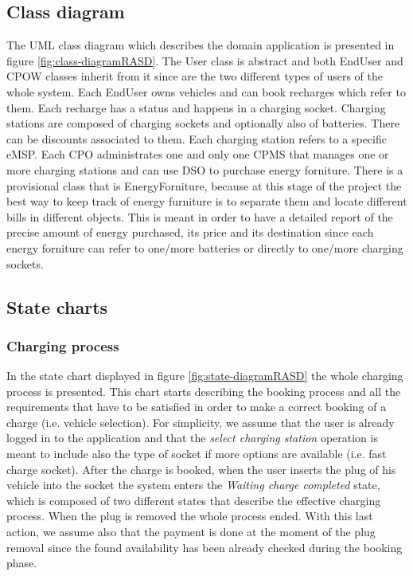 \documentclass[a4paper]{report}
\begin{document}
\subsection{Class diagram}
The UML class diagram which describes the domain application is presented in figure \ref{fig:class-diagramRASD}. The User class is abstract and both EndUser and CPOW classes inherit from it since are the two different types of users of the whole system. Each EndUser owns vehicles and can book recharges which refer to them. Each recharge has a status and happens in a charging socket. Charging stations are composed of charging sockets and optionally also of batteries. There can be discounts associated to them. Each charging station refers to a specific eMSP. Each CPO administrates one and only one CPMS that manages one or more charging stations and can use DSO to purchase energy forniture. There is a provisional class that is EnergyForniture, because at this stage of the project the best way to keep track of energy furniture is to separate them and locate different bills in different objects. This is meant in order to have a detailed report of the precise amount of energy purchased, its price and its destination since each energy forniture can refer to one/more batteries or directly to one/more charging sockets.

\subsection{State charts}
\subsubsection{Charging process}
In the state chart displayed in figure \ref{fig:state-diagramRASD} the whole charging process is presented. This chart starts describing the booking process and all the requirements that have to be satisfied in order to make a correct booking of a charge (i.e. vehicle selection).  For simplicity, we assume that the user is already logged in to the application and that the \textit{select charging station} operation is meant to include also the type of socket if more options are available (i.e. fast charge socket). After the charge is booked, when the user inserts the plug of his vehicle into the socket the system enters the \textit{Waiting charge completed} state, which is composed of two different states that describe the effective charging process. When the plug is removed the whole process ended. With this last action, we assume also that the payment is done at the moment of the plug removal since the found availability has been already checked during the booking phase.
\end{document}
